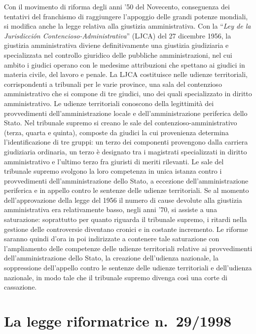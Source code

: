\documentclass[12pt,it,a4paper,]{report}
\begin{document}
Con il movimento di riforma degli anni '50 del Novecento, conseguenza
dei tentativi del franchismo di raggiungere l'appoggio delle grandi
potenze mondiali, si modifica anche la legge relativa alla giustizia
amministrativa. Con la ``\emph{Ley de la Jurisdicción
Contencioso-Administrativa}'' (LJCA) del 27 dicembre 1956, la giustizia
amministrativa diviene definitivamente una giustizia giudiziaria e
specializzata nel controllo giuridico delle pubbliche amministrazioni,
nel cui ambito i giudici operano con le medesime attribuzioni che
spettano ai giudici in materia civile, del lavoro e penale. La LJCA
costituisce nelle udienze territoriali, corrispondenti a tribunali per
le varie province, una sala del contenzioso amministrativo che si
compone di tre giudici, uno dei quali specializzato in diritto
amministrativo. Le udienze territoriali conoscono della legittimità dei
provvedimenti dell'amministrazione locale e dell'amministrazione
periferica dello Stato. Nel tribunale supremo si creano le sale del
contenzioso-amministrativo (terza, quarta e quinta), composte da giudici
la cui provenienza determina l'identificazione di tre gruppi: un terzo
dei componenti provengono dalla carriera giudiziaria ordinaria, un terzo
è designato tra i magistrati specializzati in diritto amministrativo e
l'ultimo terzo fra giuristi di meriti rilevanti. Le sale del tribunale
supremo svolgono la loro competenza in unica istanza contro i
provvedimenti dell'amministrazione dello Stato, a eccezione
dell'amministrazione periferica e in appello contro le sentenze delle
udienze territoriali. Se al momento dell'approvazione della legge del
1956 il numero di cause devolute alla giustizia amministrativa era
relativamente basso, negli anni '70, si assiste a una saturazione:
soprattutto per quanto riguarda il tribunale supremo, i ritardi nella
gestione delle controversie diventano cronici e in costante incremento.
Le riforme saranno quindi d'ora in poi indirizzate a contenere tale
saturazione con l'ampliamento delle competenze delle udienze
territoriali relative ai provvedimenti dell'amministrazione dello Stato,
la creazione dell'udienza nazionale, la soppressione dell'appello contro
le sentenze delle udienze territoriali e dell'udienza nazionale, in modo
tale che il tribunale supremo divenga così una corte di cassazione.

\hypertarget{la-legge-riformatrice-n.-291998}{%
\section{La legge riformatrice
n.~29/1998}\label{la-legge-riformatrice-n.-291998}}
\end{document}
